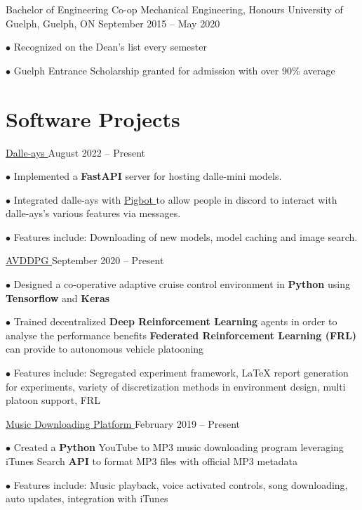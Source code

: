 \documentclass[a4paper,11pt]{article}
\newcommand{\github}{cboin1996} %
\newcommand{\sectionsep}{\vspace{-2.5mm}}
\begin{document}
\resumeEdu
{Bachelor of Engineering Co-op Mechanical Engineering, Honours }
{University of Guelph, Guelph, ON}
{September 2015 -- May 2020}
{}

\resumeItemListStart
\item[$\bullet$] Recognized on the Dean's list every semester
\item[$\bullet$] Guelph Entrance Scholarship granted for admission with over 90\% average
\resumeItemListEnd
\resumeSubHeadingListEnd
\sectionsep

\section{Software Projects}
\resumeSubHeadingListStart
\resumeProject
{\href{https://github.com/cboin1996/dalle-ays}{Dalle-ays \footnotesize{\faExternalLink}}} %
{August 2022 -- Present} %
\resumeItemListStart
\item[$\bullet$] Implemented a \textbf{FastAPI} server for hosting dalle-mini models.
\item[$\bullet$] Integrated dalle-ays with \href{https://github.com/cboin1996/pigbot}{Pigbot \footnotesize{\faExternalLink}}
to allow people in discord to interact with dalle-ays's various features via messages.
\item[$\bullet$] Features include: Downloading of new models, model caching and image search.

\resumeItemListEnd
\resumeProject
{\href{https://github.com/\github/avddpg}{AVDDPG \footnotesize{\faExternalLink}}}
{September 2020 -- Present} %
\resumeItemListStart
\item[$\bullet$] Designed a co-operative adaptive cruise control environment in \textbf{Python} using \textbf{Tensorflow} and
\textbf{Keras}
\item[$\bullet$] Trained decentralized \textbf{Deep Reinforcement Learning} agents in order to analyse the performance benefits \textbf{Federated Reinforcement Learning (FRL)}
can provide to autonomous vehicle platooning
\item[$\bullet$] Features include: Segregated experiment framework, \LaTeX \hspace{0.5pt} report generation for experiments,
variety of discretization methods in environment design, multi platoon support, FRL
\resumeItemListEnd

\resumeProject
{\href{https://github.com/cboin1996/JukeBox}{Music Downloading Platform \footnotesize{\faExternalLink}}} %
{February 2019 -- Present} %
\resumeItemListStart
\item[$\bullet$] Created a \textbf{Python} YouTube to MP3 music downloading program leveraging iTunes Search \textbf{API} to format
MP3 files with official MP3 metadata
\item[$\bullet$] Features include: Music playback, voice activated controls, song downloading, auto updates,
integration with iTunes
\resumeItemListEnd
\end{document}
